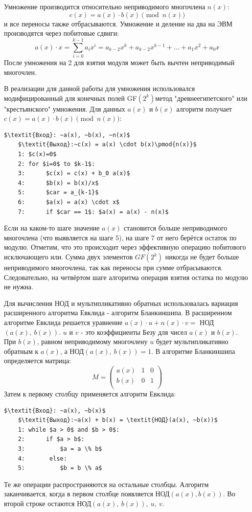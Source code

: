 \documentclass[times,specification,annotation]{itmo-student-thesis}
\begin{document}
Умножение производится относительно неприводимого многочлена $n(x)$:
\[c(x) = a(x) \cdot b(x)\pmod{n(x)}\]
и все переносы также отбрасываются.
Умножение и деление на два  на ЭВМ производятся через побитовые сдвиги:
\[a(x) \cdot x = \sum_{i=0}^{k-1}a_i x^i = a_{k-2}x^{k} + a_{k-2}x^{k-1} + \dots + a_1 x^2 + a_0 x\]
После умножения на 2 для взятия модуля может быть вычтен неприводимый многочлен.

В реализации для данной работы для умножения использовался модифицированный для конечных полей GF$(2^k)$метод
"древнеегипетского" или "крестьянского" умножения.
Для данных $a(x)$ и $b(x)$ алгоритм получает $c(x) = a(x) \cdot b(x) \pmod{n(x)}$:
\begin{lstlisting}[mathescape=true]
    $\textit{Вход}: ~a(x), ~b(x), ~n(x)$
    $\textit{Выход}:~c(x) = a(x) \cdot b(x)\pmod{n(x)}$
    1: $c(x)=0$
    2: for $i=0$ to $k-1$:
    3:      $c(x) = c(x) + b_0 a(x)$
    4:      $b(x) = b(x)/x$
    5:      $car = a_{k-1}$
    6:      $a(x) = a(x) \cdot x$
    7:      if $car == 1$: $a(x) = a(x) - n(x)$
\end{lstlisting}
Если на каком-то шаге значение $a(x)$ становится больше неприводимого многочлена (что выявляется на шаге 5), на шаге 7
от него берётся остаток по модулю.
Отметим, что это происходит через эффективную операцию побитового исключающего или.
Сумма двух элементов $GF(2^k)$ никогда не будет больше неприводимого многочлена, так как переносы при сумме отбрасываются.
Следовательно, на четвёртом шаге алгоритма операция взятия остатка по модулю не нужна.

Для вычисления НОД и мультипликативно обратных использовалась вариация расширенного алгоритма Евклида
- алгоритм Бланкиншипа.
В расширенном алгоритме Евклида решается уравнение $a(x) \cdot u + n(x) \cdot v =$ НОД$(a(x), ~b(x))$.
$u$ и $v$ - это коэффициенты Безу для чисел $a(x)$ и $b(x)$.
При $b(x)$, равном неприводимому многочлену $u$ будет мультипликативно обратным к $a(x)$, а НОД$(a(x), ~b(x)) = 1$.
В алгоритме Бланкиншипа определяется матрица:
\begin{equation*}
M =
\begin{pmatrix}
a(x) & 1 & 0 \\
b(x) & 0 & 1\\
\end{pmatrix}
\end{equation*}
Затем к первому столбцу применяется алгоритм Евклида:
\begin{lstlisting}[mathescape=true]
    $\textit{Вход}: ~a(x), ~b(x)$
    $\textit{Выход}:~a(x) + b(x) = \textit{НОД}(a(x), ~b(x))$
    1: while $a > 0$ and $b > 0$:
    2:      if $a > b$:
    3:          $a = a \% b$
    4:       else:
    5:          $b = b \% a$
\end{lstlisting}
Те же операции распространяются на остальные столбцы.
Алгоритм заканчивается, когда в первом столбце появляется НОД$(a(x), b(x))$.
Во второй строке остаются НОД$(a(x), ~b(x)), ~u, ~v$.
\end{document}
